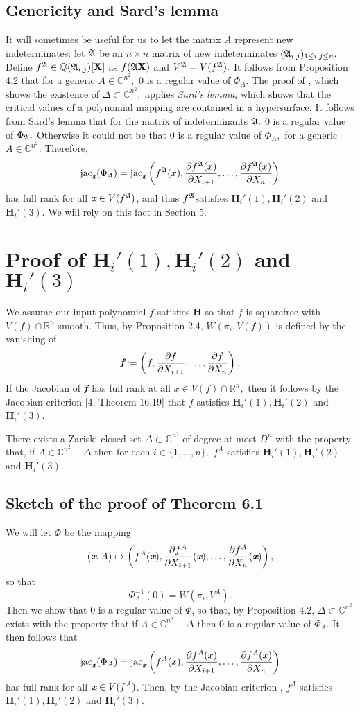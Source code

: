\documentclass[sigconf]{acmart}
\def\xb{\textit{\textbf{x}}}
\def\fb{\textit{\textbf{f}}}
\def\C{\mathbb{C}}
\def\jac{ \textrm{jac}}
\def\pa{\partial}
\def\A{\frak{A}}
\begin{document}
\subsection{Genericity and Sard's lemma}
%
It will sometimes be useful for us to let the matrix $A$ represent new
indeterminates: let $\A$ be an $n \times n$ matrix of new
indeterminates $(\A_{i,j})_{1 \leq i , j \leq n}.$ Define $f^{\A} \in
\mathbb{Q}(\A_{i,j})[\textbf{X}]$ as $f(\A\textbf{X})$ and
$V^\A=V(f^\A).$ It follows from Proposition 4.2 that for a generic $A
\in \C^{n^2},$ $0$ is a regular value of $\Phi_{A}$.  The proof of
\cite[Theorem B.3]{NO}, which shows the existence of $\Delta \subset
\C^{n^2},$ applies \textit{Sard's lemma}, which shows that the
critical values of a polynomial mapping are contained in a
hypersurface. It follows from Sard's lemma that for the matrix of
indeterminants $\A,$ $0$ is a regular value of $\Phi_{\A}.$ Otherwise
it could not be that $0$ is a regular value of $\Phi_A,$ for a generic
$A\in \C^{n^2}.$ Therefore,
\[
\jac_{\xb}(\Phi_{\A}) = \jac_{\xb}\left(f^{\A}(x),\frac{\pa f^{\A}(x)}{\pa X_{i+1}},\hdots,\frac{\pa f^{\A}(x)}{\pa X_n}\right)
\]
has full rank for all $\xb \in V(f^{\A})$, and thus $f^{\A}$satisfies $\textbf{H}_i'(1),\textbf{H}_i'(2)$ and $\textbf{H}_i'(3)$. We will rely on this fact in Section 5. 
%
\section{Proof of $\textbf{H}_i'(1),\textbf{H}_i'(2)$ and $\textbf{H}_i'(3)$}
%
We assume our input polynomial $f$ satisfies \textbf{H} so that $f$ is squarefree with $V(f) \cap \mathbb{R}^n$ smooth. Thus, by Proposition 2.4,  $W(\pi_i,V(f))$ is defined by the vanishing of \[\fb := \left(f,\frac{\pa f}{\pa X_{i+1}},\hdots,\frac{\pa f}{\pa X_n}\right).\]
If the Jacobian of $\fb$ has full rank at all $x \in V(f) \cap \mathbb{R}^n,$ then it follows by the Jacobian criterion [4, Theorem 16.19] that $f$ satisfies $\textbf{H}_i'(1),\textbf{H}_i'(2)$ and $\textbf{H}_i'(3)$. 
%
\begin{theorem}
There exists a Zariski closed set $\Delta \subset \C^{n^2}$ of degree at most $D^n$ with the property that, if $A \in \C^{n^2} - \Delta$ then for each $i \in \{1,\hdots,n\},$ $f^A$ satisfies $\textbf{H}_i'(1),\textbf{H}_i'(2)$ and $\textbf{H}_i'(3)$.
\end{theorem}
%
\subsection{Sketch of the proof of Theorem 6.1}
%
We will let $\Phi$ be the mapping 
\[
(\xb,A) \mapsto \left(f^A(\xb), \frac{\partial f^A}{\partial X_{i+1}}(\xb),\hdots,\frac{\partial f^A}{\partial X_n}(\xb)\right),
\] 
so that 
\[
\Phi_A^{-1}(0)= W(\pi_i,V^A).
\]
Then we show that $0$ is a regular value of $\Phi$, so that, by Proposition 4.2, $\Delta \subset \C^{n^2}$ exists with the property that if $A \in \C^{n^2}-\Delta$ then $0$ is a regular value of $\Phi_A.$ It then follows that 
\[
\jac_{\xb}(\Phi_A) = \jac_{\xb}\left(f^A(x),\frac{\pa f^A(x)}{\pa X_{i+1}},\hdots,\frac{\pa f^A(x)}{\pa X_n}\right)
\]
has full rank for all $\xb \in V(f^A)$. Then, by the Jacobian criterion \cite[Theorem 16.19]{ECA}, $f^A$ satisfies $\textbf{H}_i'(1),\textbf{H}_i'(2)$ and $\textbf{H}_i'(3)$.
\end{document}
